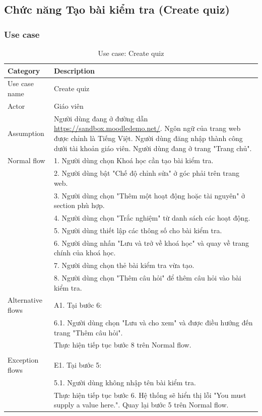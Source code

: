 \documentclass[a4paper, 12pt]{article}
\begin{document}
\subsection{Chức năng Tạo bài kiểm tra (Create quiz)}
\subsubsection{Use case}

\begin{table}[H]
    \centering
    \begin{tabular}{|l|p{11cm}|}
        \hline
        Category & Description \\
        \hline
        Use case name & Create quiz \\
        \hline
        Actor & Giáo viên \\
        \hline
        Assumption & Người dùng đang ở đường dẫn \url{https://sandbox.moodledemo.net/}. Ngôn ngữ của trang web được chỉnh là Tiếng Việt. Người dùng đăng nhập thành công dưới tài khoản giáo viên. Người dùng đang ở trang "Trang chủ".\\\hline
        Normal flow & 
        1. Người dùng chọn Khoá học cần tạo bài kiểm tra. \\
        & 2. Người dùng bật "Chế độ chỉnh sửa" ở góc phải trên trang web. \\
        & 3. Người dùng chọn "Thêm một hoạt động hoặc tài nguyên" ở section phù hợp.\\
        & 4. Người dùng chọn "Trắc nghiệm" từ danh sách các hoạt động.\\
        & 5. Người dùng thiết lập các thông số cho bài kiểm tra.\\
        & 6. Người dùng nhấn "Lưu và trở về khoá học" và quay về trang chính của khoá học.\\
        & 7. Người dùng chọn thẻ bài kiểm tra vừa tạo.\\
        & 8. Người dùng chọn "Thêm câu hỏi" để thêm câu hỏi vào bài kiểm tra.\\\hline
        Alternative flows &
        A1. Tại bước 6:\\
        & 6.1. Người dùng chọn "Lưu và cho xem" và được điều hướng đến trang "Thêm câu hỏi".\\
        & Thực hiện tiếp tục bước 8 trên Normal flow.\\
        \\\hline
        Exception flows &
        E1. Tại bước 5:\\
        & 5.1. Người dùng không nhập tên bài kiểm tra.\\
        & Thực hiện tiếp tục bước 6. Hệ thống sẽ hiển thị lỗi "You must supply a value here.". Quay lại bước 5 trên Normal flow.\\\hline
    \end{tabular}
    \caption{Use case: Create quiz}
    \label{tab:create-quiz}
\end{table}
\end{document}
